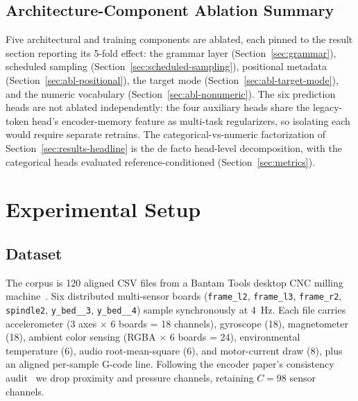 \documentclass[sensors,article,submit,moreauthors,pdftex]{Definitions/mdpi}
\begin{document}
\subsection{Architecture-Component Ablation Summary}
\label{sec:arch-ablation-summary}

Five architectural and training components are ablated, each pinned to the result section reporting its 5-fold effect: the grammar layer (Section~\ref{sec:grammar}), scheduled sampling (Section~\ref{sec:scheduled-sampling}), positional metadata (Section~\ref{sec:abl-positional}), the target mode (Section~\ref{sec:abl-target-mode}), and the numeric vocabulary (Section~\ref{sec:abl-nonumeric}). The six prediction heads are not ablated independently: the four auxiliary heads share the legacy-token head's encoder-memory feature as multi-task regularizers, so isolating each would require separate retrains. The categorical-vs-numeric factorization of Section~\ref{sec:results-headline} is the de facto head-level decomposition, with the categorical heads evaluated reference-conditioned (Section~\ref{sec:metrics}).

\section{Experimental Setup}
\label{sec:setup}

\subsection{Dataset}
\label{sec:dataset}

The corpus is 120 aligned CSV files from a Bantam Tools desktop CNC milling machine~\cite{encoder_paper}. Six distributed multi-sensor boards (\texttt{frame\_l2}, \texttt{frame\_l3}, \texttt{frame\_r2}, \texttt{spindle2}, \texttt{y\_bed\_\_3}, \texttt{y\_bed\_\_4}) sample synchronously at 4~Hz. Each file carries accelerometer (3 axes $\times$ 6 boards = 18 channels), gyroscope (18), magnetometer (18), ambient color sensing (RGBA $\times$ 6 boards = 24), environmental temperature (6), audio root-mean-square (6), and motor-current draw (8), plus an aligned per-sample G-code line. Following the encoder paper's consistency audit~\cite{encoder_paper} we drop proximity and pressure channels, retaining $C=98$ sensor channels.
\end{document}
